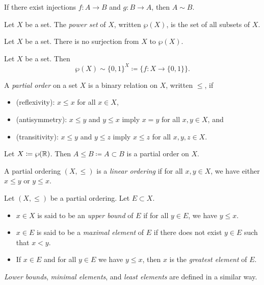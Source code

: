 \documentclass{techreport}
\begin{document}
\begin{theorem}
	If there exist injections $f:A \to B$ and $g : B \to A$, then $A \sim B$.
\end{theorem}

\begin{definition}
	Let $X$ be a set.
	The \emph{power set} of $X$, written $\wp(X)$, is the set of all subsets of $X$.
\end{definition}

\begin{lemma}[Cantor]
	Let $X$ be a set. There is no surjection from $X$ to $\wp(X)$.
\end{lemma}

\begin{remark}
	Let $X$ be a set. Then
	\[
	\wp(X) \sim \{0,1\}^X \coloneqq \{ f : X \to \{0,1\} \}.
	\]
\end{remark}

\begin{definition}
	A \emph{partial order} on a set $X$ is a binary relation on $X$, written ${\le}$, if
	\begin{itemize}
		\item (reflexivity): $x \le x$ for all $x \in X$,
		\item (antisymmetry): $x \le y$ and $y \le x$ imply $x = y$ for all $x,y \in X$, and
		\item (transitivity): $x \le y$ and $y \le z$ imply $x \le z$ for all $x,y,z \in X$.
	\end{itemize}
\end{definition}

\begin{example}
	Let $X \coloneqq \wp(\mathbb{R})$.
	Then $A \le B \coloneqq A \subset B$ is a partial order on $X$.
\end{example}

\begin{definition}
	A partial ordering $(X,{\le})$ is a \emph{linear ordering} if for all $x,y \in X$, we have either $x \le y$ or $y \le x$.
\end{definition}

\begin{definition}
	Let $(X,{\le})$ be a partial ordering.
	Let $E \subset X$.
	\begin{itemize}
		\item $x \in X$ is said to be an \emph{upper bound} of $E$ if for all $y \in E$, we have $y \le x$.
		\item $x \in E$ is said to be a \emph{maximal element} of $E$ if there does not exist $y \in E$ such that $x < y$.
		\item If $x \in E$ and for all $y \in E$ we have $y \le x$, then $x$ is the \emph{greatest element} of $E$.
	\end{itemize}
	\emph{Lower bounds}, \emph{minimal elements}, and \emph{least elements} are defined in a similar way.
\end{definition}
\end{document}
